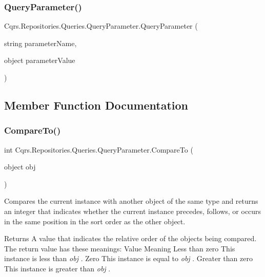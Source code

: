 \subsubsection{\texorpdfstring{Query\+Parameter()}{QueryParameter()}\hspace{0.1cm}{\footnotesize\ttfamily [2/2]}}
{\footnotesize\ttfamily Cqrs.\+Repositories.\+Queries.\+Query\+Parameter.\+Query\+Parameter (\begin{DoxyParamCaption}\item[{string}]{parameter\+Name,  }\item[{object}]{parameter\+Value }\end{DoxyParamCaption})}



\subsection{Member Function Documentation}
\mbox{\label{classCqrs_1_1Repositories_1_1Queries_1_1QueryParameter_a59a2bda12bc0161d0ceb95eb02062d08}} 
\subsubsection{\texorpdfstring{Compare\+To()}{CompareTo()}\hspace{0.1cm}{\footnotesize\ttfamily [1/2]}}
{\footnotesize\ttfamily int Cqrs.\+Repositories.\+Queries.\+Query\+Parameter.\+Compare\+To (\begin{DoxyParamCaption}\item[{object}]{obj }\end{DoxyParamCaption})}



Compares the current instance with another object of the same type and returns an integer that indicates whether the current instance precedes, follows, or occurs in the same position in the sort order as the other object. 

\begin{DoxyReturn}{Returns}
A value that indicates the relative order of the objects being compared. The return value has these meanings\+: Value Meaning Less than zero This instance is less than {\itshape obj} . Zero This instance is equal to {\itshape obj} . Greater than zero This instance is greater than {\itshape obj} . 
\end{DoxyReturn}

